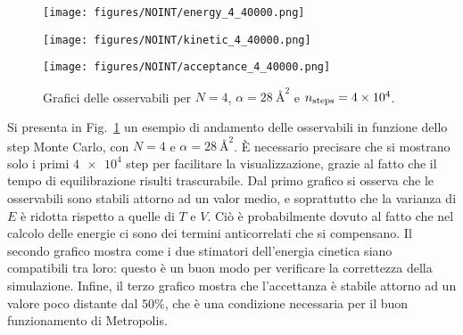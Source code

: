 \documentclass[a4paper, titlepage]{article}
\begin{document}
\begin{figure}[h!]
    \centering
    \begin{minipage}{0.32 \textwidth}
        \centering
        \texttt{[image: figures/NOINT/energy\_4\_40000.png]}
        \label{fig:energyNOINT}
    \end{minipage}
    \begin{minipage}{0.32 \textwidth}
        \centering
        \texttt{[image: figures/NOINT/kinetic\_4\_40000.png]}
        \label{fig:kineticNOINT}
    \end{minipage}
    \begin{minipage}{0.32 \textwidth}
        \centering
        \texttt{[image: figures/NOINT/acceptance\_4\_40000.png]}
        \label{fig:acceptanceNOINT}
    \end{minipage}
    \vspace{-0.5cm}
    \caption{Grafici delle osservabili per $N = 4$, $\alpha = 28\ \unit{\angstrom\squared}$ e $n_{\rm steps} = \num{4e4}$.}
    \label{fig:NOINT_obs}
\end{figure}
Si presenta in Fig.\ \ref{fig:NOINT_obs} un esempio di andamento delle osservabili in funzione dello step Monte Carlo, con $N = 4$ e $\alpha = 28\ \unit{\angstrom\squared}$.
È necessario precisare che si mostrano solo i primi $\num{4e4}$ step per facilitare la visualizzazione, grazie al fatto che il tempo di equilibrazione risulti trascurabile. Dal primo grafico si osserva che le osservabili sono stabili attorno ad un valor medio, e soprattutto che la varianza di $E$ è ridotta rispetto a quelle di $T$ e $V$. Ciò è probabilmente dovuto al fatto che nel calcolo delle energie ci sono dei termini anticorrelati che si compensano. Il secondo grafico mostra come i due stimatori dell'energia cinetica siano compatibili tra loro: questo è un buon modo per verificare la correttezza della simulazione. Infine, il terzo grafico mostra che l'accettanza è stabile attorno ad un valore poco distante dal $50\%$, che è una condizione necessaria per il buon funzionamento di Metropolis.
\end{document}
